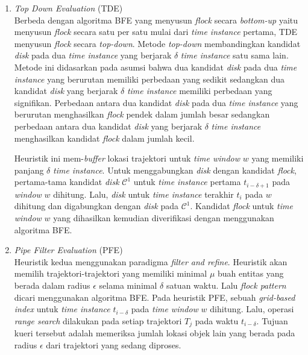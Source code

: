 \begin{enumerate}
\item \textit{Top Down Evaluation} (TDE)\\
Berbeda dengan algoritma BFE yang menyusun \textit{flock} secara \textit{bottom-up} yaitu menyusun \textit{flock} secara satu per satu mulai dari \textit{time instance} pertama, TDE menyusun \textit{flock} secara \textit{top-down}. Metode \textit{top-down} membandingkan kandidat \textit{disk} pada dua \textit{time instance} yang berjarak $\delta$ \textit{time instance} satu sama lain. Metode ini didasarkan pada asumsi bahwa dua kandidat \textit{disk} pada dua \textit{time instance} yang berurutan 
 memiliki perbedaan yang sedikit sedangkan dua kandidat \textit{disk} yang berjarak $\delta$ \textit{time instance} memiliki perbedaan yang signifikan. Perbedaan antara dua kandidat \textit{disk} pada dua \textit{time instance} yang berurutan menghasilkan \textit{flock} pendek dalam jumlah besar sedangkan perbedaan antara dua kandidat \textit{disk} yang berjarak $\delta$ \textit{time instance} menghasilkan kandidat \textit{flock} dalam jumlah kecil.
 
 \par Heuristik ini mem-\textit{buffer} lokasi trajektori untuk \textit{time window} $w$ yang memiliki panjang $\delta$ \textit{time instance}. Untuk menggabungkan \textit{disk} dengan kandidat \textit{flock}, pertama-tama kandidat \textit{disk} $\mathcal{C}^1$ untuk \textit{time instance} pertama $t_{i-\delta+1}$ pada \textit{window} $w$ dihitung. Lalu, \textit{disk} untuk \textit{time instance} terakhir $t_i$ pada $w$ dihitung dan digabungkan dengan \textit{disk} pada $\mathcal{C}^1$. Kandidat \textit{flock} untuk \textit{time window} $w$ yang dihasilkan kemudian diverifikasi dengan menggunakan algoritma BFE.

\item \textit{Pipe Filter Evaluation} (PFE)\\
Heuristik kedua menggunakan paradigma \textit{filter and refine}. Heuristik akan memilih trajektori-trajektori yang memiliki minimal $\mu$ buah entitas yang berada dalam radius $\epsilon$ selama minimal $\delta$ satuan waktu. Lalu \textit{flock pattern} dicari menggunakan algoritma BFE. Pada heuristik PFE, sebuah \textit{grid-based index} untuk \textit{time instance} $t_{i-\delta}$ pada \textit{time window} $w$ dihitung. Lalu, operasi \textit{range search} dilakukan pada setiap trajektori $T_j$ pada waktu $t_{i-\delta}$. Tujuan kueri tersebut adalah memeriksa jumlah lokasi objek lain yang berada pada radius $\epsilon$ dari trajektori yang sedang diproses. 


\end{enumerate}

